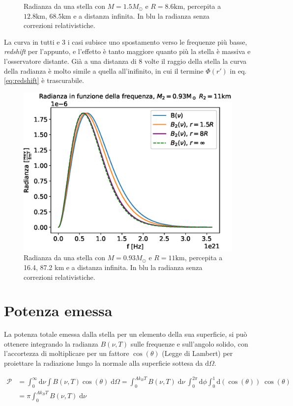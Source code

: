 \documentclass[a4paper, titlepage]{article}
\begin{document}
\begin{figure}[h]
\begin{minipage}{0.49\textwidth}
        \caption{Radianza da una stella con $M = 1.5M_\odot$ e $R = 8.6\unit{\kilo\meter}$, percepita a $12.8 \unit{\kilo\meter}$, $68.5 \unit{\kilo\meter}$ e a distanza infinita.
        In blu la radianza senza correzioni relativistiche.\\}
        \label{fig:rad2}
    \end{minipage}
\end{figure}

La curva in tutti e 3 i casi subisce uno spostamento verso le frequenze più basse, \textit{redshift} per l'appunto, e l'effetto è tanto maggiore quanto più la stella è massiva e l'osservatore distante. Già a una distanza di 8 volte il raggio della stella la curva della radianza è molto simile a quella all'inifinito, in cui il termine $\Phi (r')$ in eq. \ref{eq:redshift} è trascurabile.
\begin{figure}[h]
    \centering
    \includegraphics[width = 0.6 \textwidth]{Figures/radianza2.eps}
    \caption{Radianza da una stella con $M = 0.93M_\odot$ e $R = 11\unit{\kilo\meter}$, percepita a 16.4, 87.2 \unit{\kilo\meter} e a distanza infinita.
    In blu la radianza senza correzioni relativistiche.}
    \label{fig:rad3}
\end{figure}



\section{Potenza emessa}
La potenza totale emessa dalla stella per un elemento della sua superficie, si può ottenere integrando la radianza $B(\nu, T)$ sulle frequenze e sull'angolo solido, con l'accortezza di moltiplicare per un fattore $\cos(\theta)$ (Legge di Lambert) per proiettare la radiazione lungo la normale alla superficie sottesa da $\mathrm{d}\Omega$.

\begin{align}
    \mathcal P &= \int_0^\infty \mathrm{d}\nu \int B(\nu, T) \cos(\theta) \; \mathrm{d}\Omega
    =  \int_0^{A k_B T} B(\nu, T) \; \mathrm{d}\nu ~ 
    \int_0^{2 \pi} \mathrm{d}\phi \int_0^1 \mathrm{d}(\cos(\theta)) \; \cos(\theta) \\
    &= \pi \int_0^{A k_B T} B(\nu, T) \; \mathrm{d}\nu
    \label{eq:Pot}
\end{align}
\end{document}
